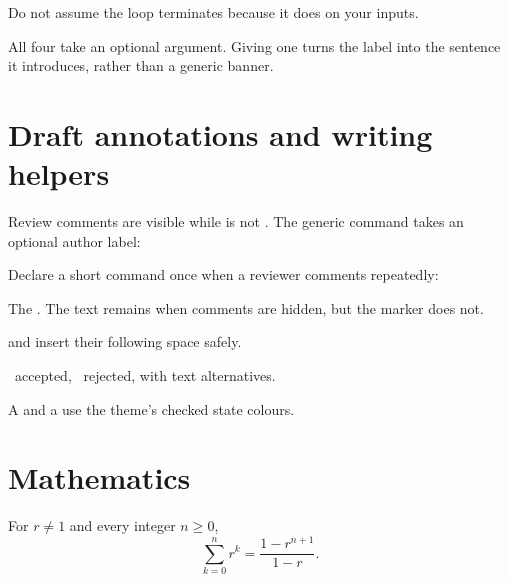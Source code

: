 \documentclass[letterpaper,11pt]{article}
\begin{document}
\begin{caution}
  Do not assume the loop terminates because it does on your inputs.
\end{caution}

\begin{callout}
  All four take an optional argument.
  Giving one turns the label into the sentence it introduces, rather than a generic banner.
\end{callout}

\section{Draft annotations and writing helpers}

Review comments are visible while  is not
. The generic command takes an optional author label:


Declare a short command once when a reviewer comments repeatedly:


The . The text remains
when comments are hidden, but the marker does not.

\begin{smalldescription}
  \item[Abbreviations] \ie \eg and \etal insert their following space safely.
  \item[Marks] \cmark\ accepted, \xmark\ rejected, with text alternatives.
  \item[Comparisons] A  and a  use
    the theme's checked state colours.
\end{smalldescription}

\section{Mathematics}

\begin{theorem}
  For $r\neq 1$ and every integer $n\geq 0$,
  \[
    \sum_{k=0}^{n}r^k=\frac{1-r^{n+1}}{1-r}.
  \]
\end{theorem}
\end{document}
